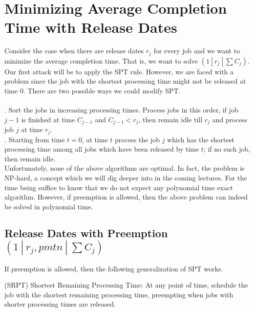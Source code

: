 \documentclass[11pt]{article}
\begin{document}
\MakeScribeTop
\section{Minimizing Average Completion Time with Release Dates}
Consider the case when there are release dates $r_j$ for every job and we want to minimize the average completion time.
That is, we want to solve $(1~|~r_j~|~\sum C_j)$. Our first attack will be to apply the SPT rule. However, we are faced with a problem
since the job with the shortest processing time might not be released at time $0$. There are two possible ways we could 
modify SPT. \\
\\
. Sort the jobs in increasing processing times. Process jobs in this order, if job $j-1$ is finished at time $C_{j-1}$ and
$C_{j-1} < r_j$, then remain idle till $r_j$ and process job $j$ at time $r_j$. \\

. Starting from time $t=0$, at time $t$ process the job $j$ which has the shortest processing time among all jobs which have
been released by time $t$; if no such job, then remain idle. \\

\noindent
Unfortunately, none of the above algorithms are optimal. In fact, the problem is NP-hard, a concept which we will dig deeper into 
in the coming lectures. For the time being suffice to know that we do not expect any polynomial time exact algorithm. 
However, if preemption is allowed, then the above problem can indeed be solved in polynomial time.

\subsection{Release Dates with Preemption $(1~|~r_j,pmtn~|~\sum C_j)$}
If preemption is allowed, then the following generalization of SPT works.
\begin{definition}
(SRPT) Shortest Remaining Processing Time: At any point of time, schedule the job with the shortest remaining processing time,
preempting when jobs with shorter processing times are released.
\end{definition}
\end{document}
